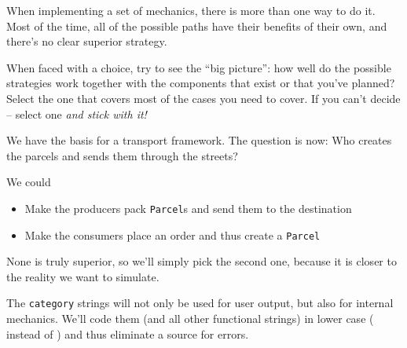 \begin{frame}
%
\begin{hintbox}
When implementing a set of mechanics, there is more than one way to do it. Most of the time, all of the possible paths have their benefits of their own, and there's no clear superior strategy.

When faced with a choice, try to see the \enquote{big picture}: how well do the possible strategies work together with the components that exist or that you've planned? Select the one that covers most of the cases you need to cover. If you can't decide -- select one \emph{and stick with it!}
\end{hintbox}
%
\end{frame}


\begin{frame}
%
\begin{tcolorbox}[title=Design Rule: Consumers place orders]
We have the basis for a transport framework. The question is now: Who creates the parcels and sends them through the streets?

We could
\begin{itemize}
\item Make the producers pack \texttt{Parcel}s and send them to the destination
\item Make the consumers place an order and thus create a \texttt{Parcel}
\end{itemize}

None is truly superior, so we'll simply pick the second one, because it is closer to the reality we want to simulate.
\end{tcolorbox}
%
\begin{tcolorbox}[title=Design Rule: Lower Case Strings]
The \texttt{category} strings will not only be used for user output, but also for internal mechanics. We'll code them (and all other functional strings) in lower case (\ie {} instead of ) and thus eliminate a source for errors.
\end{tcolorbox}
%
\end{frame}


